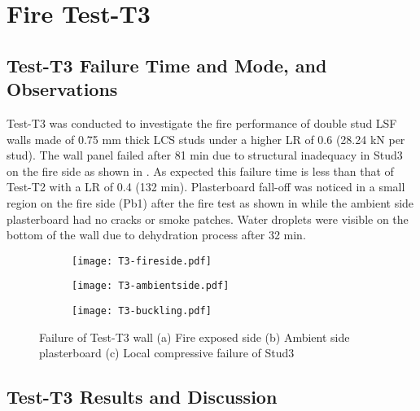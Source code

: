 \section{Fire Test-T3}
\subsection{Test-T3 Failure Time and Mode, and Observations}

Test-T3 was conducted to investigate the fire performance of double stud LSF walls made of 0.75 mm thick LCS studs under a higher LR of 0.6 (28.24 kN per stud). The wall panel failed after 81 min due to structural inadequacy in Stud3 on the fire side as shown in . As expected this failure time is less than that of Test-T2 with a LR of 0.4 (132 min). Plasterboard fall-off was noticed in a small region on the fire side (Pb1) after the fire test as shown in  while the ambient side plasterboard had no cracks or smoke patches. Water droplets were visible on the bottom of the wall due to dehydration process after 32 min.
\begin{figure}[!htbp]
	\centering
	\begin{subfigure}[b]{0.3\textwidth}
		\centering
		\texttt{[image: T3-fireside.pdf]}
		\caption{}
		\label{subfig:T3-fireside}
	\end{subfigure}
	\begin{subfigure}[b]{0.3\textwidth}
		\centering
		\texttt{[image: T3-ambientside.pdf]}
		\caption{}
		\label{subfig:T3-ambientside}
	\end{subfigure}
	\begin{subfigure}[b]{0.3\textwidth}
		\centering
		\texttt{[image: T3-buckling.pdf]}
		\caption{}
		\label{subfig:T3-buckling}
	\end{subfigure}
	   \caption{Failure of Test-T3 wall (a) Fire exposed side (b) Ambient side plasterboard (c) Local compressive failure of Stud3}
	   \label{fig:T3-failure}
\end{figure}

\subsection{Test-T3 Results and Discussion}

